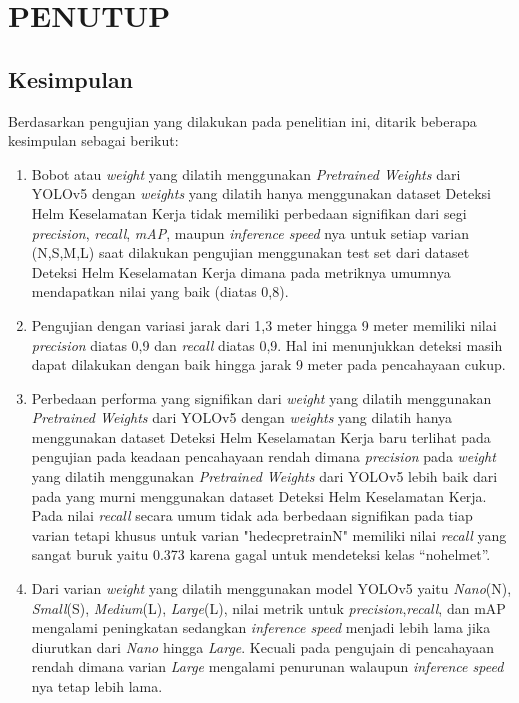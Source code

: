 \chapter{PENUTUP}
\label{chap:penutup}


\section{Kesimpulan}
\label{sec:kesimpulan}

\par Berdasarkan pengujian yang dilakukan pada penelitian ini, ditarik beberapa kesimpulan sebagai berikut:

\begin{enumerate}[nolistsep]
    \item Bobot atau \emph{weight} yang dilatih menggunakan \emph{Pretrained Weights} dari YOLOv5 dengan \emph{weights} yang dilatih hanya menggunakan dataset Deteksi Helm Keselamatan Kerja tidak memiliki perbedaan signifikan dari segi \emph{precision}, \emph{recall}, \emph{mAP}, maupun \emph{inference speed} nya untuk setiap varian (N,S,M,L) saat dilakukan pengujian menggunakan test set dari dataset Deteksi Helm Keselamatan Kerja dimana pada metriknya umumnya mendapatkan nilai yang baik (diatas 0,8).
    \item Pengujian dengan variasi jarak dari 1,3 meter hingga 9 meter memiliki nilai \emph{precision} diatas 0,9 dan \emph{recall} diatas 0,9. Hal ini menunjukkan deteksi masih dapat dilakukan dengan baik hingga jarak 9 meter pada pencahayaan cukup.
    \item Perbedaan performa yang signifikan dari \emph{weight} yang dilatih menggunakan \emph{Pretrained Weights} dari YOLOv5 dengan \emph{weights} yang dilatih hanya menggunakan dataset Deteksi Helm Keselamatan Kerja baru terlihat pada pengujian pada keadaan pencahayaan rendah dimana \emph{precision} pada \emph{weight} yang dilatih menggunakan \emph{Pretrained Weights} dari YOLOv5 lebih baik dari pada yang murni menggunakan dataset Deteksi Helm Keselamatan Kerja. Pada nilai \emph{recall} secara umum tidak ada berbedaan signifikan pada tiap varian tetapi khusus untuk varian "hedec\textunderscore pretrain\textunderscore N" memiliki nilai \emph{recall} yang sangat buruk yaitu 0.373 karena gagal untuk mendeteksi kelas “no\textunderscore helmet”.
    \item Dari varian \emph{weight} yang dilatih menggunakan model YOLOv5 yaitu \emph{Nano}(N), \emph{Small}(S), \emph{Medium}(L), \emph{Large}(L), nilai metrik untuk \emph{precision},\emph{recall}, dan mAP mengalami peningkatan sedangkan \emph{inference speed} menjadi lebih lama jika diurutkan dari \emph{Nano} hingga \emph{Large}. Kecuali pada pengujain di pencahayaan rendah dimana varian \emph{Large} mengalami penurunan walaupun \emph{inference speed} nya tetap lebih lama.

\end{enumerate}
